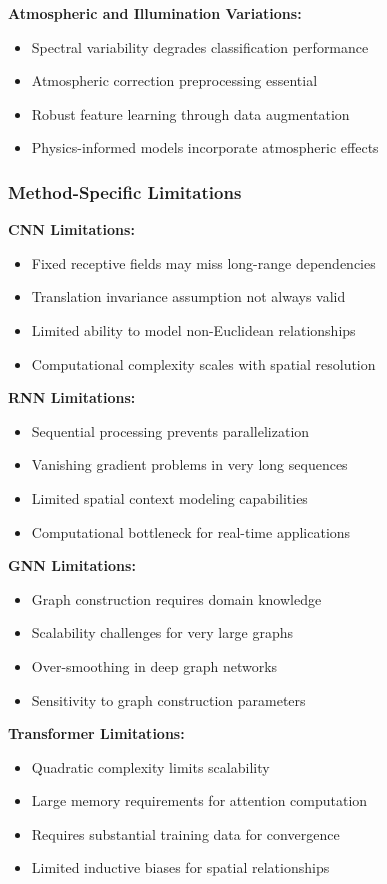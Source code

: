 \documentclass[journal]{IEEEtran}
\begin{document}
\textbf{Atmospheric and Illumination Variations:}
\begin{itemize}
\item Spectral variability degrades classification performance
\item Atmospheric correction preprocessing essential
\item Robust feature learning through data augmentation
\item Physics-informed models incorporate atmospheric effects
\end{itemize}

\subsubsection{Method-Specific Limitations}

\textbf{CNN Limitations:}
\begin{itemize}
\item Fixed receptive fields may miss long-range dependencies
\item Translation invariance assumption not always valid
\item Limited ability to model non-Euclidean relationships
\item Computational complexity scales with spatial resolution
\end{itemize}

\textbf{RNN Limitations:}
\begin{itemize}
\item Sequential processing prevents parallelization
\item Vanishing gradient problems in very long sequences
\item Limited spatial context modeling capabilities
\item Computational bottleneck for real-time applications
\end{itemize}

\textbf{GNN Limitations:}
\begin{itemize}
\item Graph construction requires domain knowledge
\item Scalability challenges for very large graphs
\item Over-smoothing in deep graph networks
\item Sensitivity to graph construction parameters
\end{itemize}

\textbf{Transformer Limitations:}
\begin{itemize}
\item Quadratic complexity limits scalability
\item Large memory requirements for attention computation
\item Requires substantial training data for convergence
\item Limited inductive biases for spatial relationships
\end{itemize}
\end{document}
